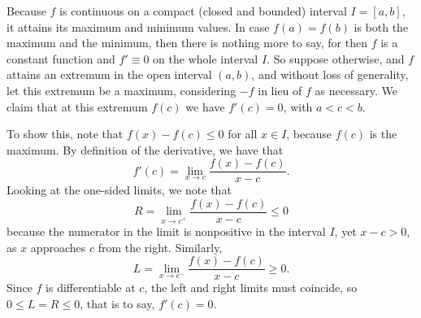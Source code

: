 \documentclass[12pt]{article}
\theoremstyle{definition}
\theoremstyle{definition}
\theoremstyle{definition}
\begin{document}
Because $f$ is continuous on a compact (closed and bounded) interval $I = [a,b]$, it attains its 
maximum and minimum values.  In case $f(a)=f(b)$ is both the maximum and 
the minimum, then there is nothing more to say, for then $f$ is a constant function and
$f' \equiv 0$ on the whole interval $I$.  So suppose otherwise, and $f$ attains an extremum 
in the open interval
$(a,b)$, and without loss of generality, let this extremum be a maximum, considering $-f$ in
lieu of $f$ as necessary.  We claim that at this extremum $f(c)$ we have $f'(c) = 0$, with $a < c < b$.

To show this, note that $f(x) - f(c) \leq 0$ for all 
$x \in I$, because $f(c)$ is the maximum.  By definition of the derivative, we have that
\[
f'(c) = \lim_{x \to c} \frac{f(x) - f(c)}{x - c}.
\]
Looking at the one-sided limits, we note that 
\[
R = \lim_{x \to c^+} \frac{f(x) - f(c)}{x - c} \leq 0
\]
because the numerator in the limit is nonpositive in the interval $I$, 
yet $x - c > 0$, as $x$ approaches $c$ from the right.  Similarly,
\[
L = \lim_{x \to c^-} \frac{f(x) - f(c)}{x - c} \geq 0.
\]
Since $f$ is differentiable at $c$, the left and right limits must coincide, so 
$0 \leq L = R \leq 0$, that is to say, $f'(c) = 0$.
\end{document}
